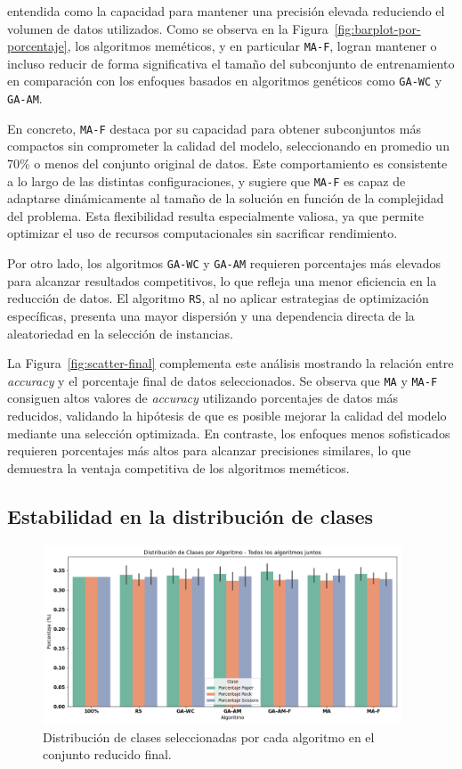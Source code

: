 entendida como la capacidad para mantener una precisión elevada reduciendo el volumen de datos utilizados.
Como se observa en la Figura~\ref{fig:barplot-por-porcentaje}, los algoritmos meméticos, y en particular \texttt{MA-F},
logran mantener o incluso reducir de forma significativa el tamaño del subconjunto de entrenamiento en comparación con
los enfoques basados en algoritmos genéticos como \texttt{GA-WC} y \texttt{GA-AM}.

En concreto, \texttt{MA-F} destaca por su capacidad para obtener subconjuntos más compactos sin comprometer la calidad del modelo,
seleccionando en promedio un 70\% o menos del conjunto original de datos.
Este comportamiento es consistente a lo largo de las distintas configuraciones,
y sugiere que \texttt{MA-F} es capaz de adaptarse dinámicamente al tamaño de la solución en función de la complejidad del problema.
Esta flexibilidad resulta especialmente valiosa, ya que permite optimizar el uso de recursos computacionales sin sacrificar rendimiento.

Por otro lado, los algoritmos \texttt{GA-WC} y \texttt{GA-AM} requieren porcentajes más elevados para alcanzar resultados competitivos,
lo que refleja una menor eficiencia en la reducción de datos.
El algoritmo \texttt{RS}, al no aplicar estrategias de optimización específicas,
presenta una mayor dispersión y una dependencia directa de la aleatoriedad en la selección de instancias.

La Figura~\ref{fig:scatter-final} complementa este análisis mostrando la relación entre \textit{accuracy} y el porcentaje final de datos seleccionados.
Se observa que \texttt{MA} y \texttt{MA-F} consiguen altos valores de \textit{accuracy} utilizando porcentajes de datos más reducidos,
validando la hipótesis de que es posible mejorar la calidad del modelo mediante una selección optimizada.
En contraste, los enfoques menos sofisticados requieren porcentajes más altos para alcanzar precisiones similares,
lo que demuestra la ventaja competitiva de los algoritmos meméticos.

\subsection{Estabilidad en la distribución de clases}\label{sec:distribucion-clases-final}
\begin{figure}[htp]
    \centering
    \includegraphics[width=0.95\textwidth]{imagenes/evaluaciones/final/distribucion-de-clases.png}
    \caption{Distribución de clases seleccionadas por cada algoritmo en el conjunto reducido final.}
    \label{fig:distribucion-de-clases-final}
\end{figure}

